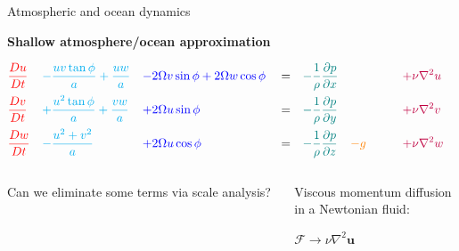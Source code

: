 \documentclass[aspectratio=169,xcolor=dvipsnames]{beamer}
\begin{document}
\begin{frame}[t]{Atmospheric and ocean dynamics}

\vspace{-1.0em}

\begin{center}
\textbf{{\large
Shallow atmosphere/ocean approximation
}}
\end{center}

\begin{align*}
    &\textcolor{red}{    \frac{Du}{Dt}   }&
    &\textcolor{cyan}{   - \frac{uv \tan\phi}{a} + \frac{uw}{a}  }& 
    & \textcolor{blue}{   - 2\Omega v \sin\phi + 2\Omega w \cos\phi   }&
    & = &
    &\textcolor{teal}{   -\frac{1}{\rho}\frac{\partial p}{\partial x}  }&
    &&
    & \textcolor{purple}{\quad + \nu \nabla^2 u }&
    \\
    &\textcolor{red}{    \frac{Dv}{Dt}   } &
    &\textcolor{cyan}{   + \frac{u^2 \tan\phi}{a} + \frac{vw}{a}     }&
    & \textcolor{blue}{   + 2\Omega u \sin\phi    }&
    & = &
    &\textcolor{teal}{   -\frac{1}{\rho}\frac{\partial p}{\partial y}  }&
    &&
    & \textcolor{purple}{\quad + \nu \nabla^2 v }&
    \\
    &\textcolor{red}{    \frac{Dw}{Dt}   } &
    &\textcolor{cyan}{   - \frac{u^2 + v^2}{a}   }&
    & \textcolor{blue}{   + 2\Omega u \cos\phi    }&
    & = &
    &\textcolor{teal}{   -\frac{1}{\rho}\frac{\partial p}{\partial z} }&
    & \textcolor{orange}{- g \quad}&
    & \textcolor{purple}{\quad + \nu \nabla^2 w }&
\end{align*}

\begin{columns}
    \begin{column}{0.7\textwidth}
        Can we eliminate some terms via scale analysis?
    \end{column}
    \begin{column}{0.3\textwidth}
        \begin{block}{}
            {\footnotesize
            Viscous momentum diffusion \\
            in a Newtonian fluid:
            }
            \begin{center}
            {\small
            $\mathcal{F}\rightarrow\nu\nabla^2\mathbf{u} $
            }
            \end{center}
        \end{block}

    \end{column}
\end{columns}

\end{frame}
\end{document}
